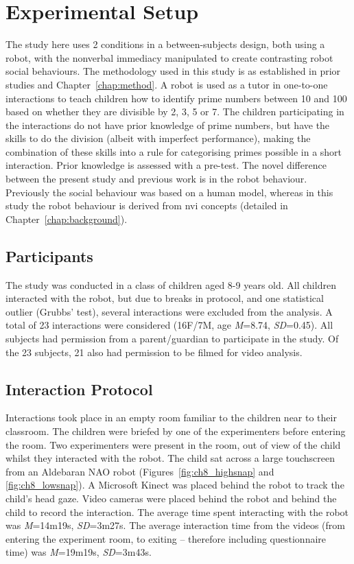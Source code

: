 \section{Experimental Setup}\label{sec:nviprimes-setup}
The study here uses 2 conditions in a between-subjects design, both using a robot, with the nonverbal immediacy manipulated to create contrasting robot social behaviours. The methodology used in this study is as established in prior studies and Chapter~\ref{chap:method}. A robot is used as a tutor in one-to-one interactions to teach children how to identify prime numbers between 10 and 100 based on whether they are divisible by 2, 3, 5 or 7. The children participating in the interactions do not have prior knowledge of prime numbers, but have the skills to do the division (albeit with imperfect performance), making the combination of these skills into a rule for categorising primes possible in a short interaction. Prior knowledge is assessed with a pre-test. The novel difference between the present study and previous work is in the robot behaviour. Previously the social behaviour was based on a human model, whereas in this study the robot behaviour is derived from \acrshort{nvi} concepts (detailed in Chapter~\ref{chap:background}).

\subsection{Participants} \label{sec:meth-participants}
The study was conducted in a class of children aged 8-9 years old. All children interacted with the robot, but due to breaks in protocol, and one statistical outlier (Grubbs' test), several interactions were excluded from the analysis. A total of 23 interactions were considered (16F/7M, age \textit{M}=8.74, \textit{SD}=0.45). All subjects had permission from a parent/guardian to participate in the study. Of the 23 subjects, 21 also had permission to be filmed for video analysis.

\subsection{Interaction Protocol} \label{sec:meth-intstruct}
Interactions took place in an empty room familiar to the children near to their classroom. The children were briefed by one of the experimenters before entering the room. Two experimenters were present in the room, out of view of the child whilst they interacted with the robot. The child sat across a large touchscreen from an Aldebaran NAO robot (Figures~\ref{fig:ch8_highsnap} and \ref{fig:ch8_lowsnap}). A Microsoft Kinect was placed behind the robot to track the child's head gaze. Video cameras were placed behind the robot and behind the child to record the interaction. The average time spent interacting with the robot was \textit{M}=14m19s, \textit{SD}=3m27s. The average interaction time from the videos (from entering the experiment room, to exiting -- therefore including questionnaire time) was \textit{M}=19m19s, \textit{SD}=3m43s.


